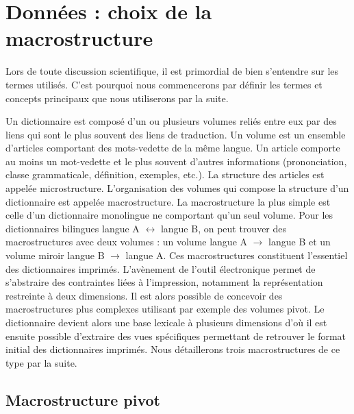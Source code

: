 \documentclass[10pt,a4paper,twoside]{article}
\begin{document}
\section{Données : choix de la macrostructure}
Lors de toute discussion scientifique, il est primordial de bien s'entendre sur les termes utilisés. C'est pourquoi nous commencerons par définir les termes et concepts principaux que nous utiliserons par la suite.

Un dictionnaire est composé d'un ou plusieurs volumes reliés entre eux par des liens qui sont le plus souvent des liens de traduction. Un volume est un ensemble d'articles comportant des mots-vedette de la même langue. Un article comporte au moins un mot-vedette et le plus souvent d'autres informations (prononciation, classe grammaticale, définition, exemples, etc.). La structure des articles est appelée microstructure. L'organisation des volumes qui compose la structure d'un dictionnaire est appelée macrostructure. La macrostructure la plus simple est celle d'un dictionnaire monolingue ne comportant qu'un seul volume. Pour les dictionnaires bilingues langue A \ensuremath{\leftrightarrow} langue B, on peut trouver des macrostructures avec deux volumes : un volume langue A \ensuremath{\to} langue B et un volume miroir langue B \ensuremath{\to} langue A. Ces macrostructures constituent l'essentiel des dictionnaires imprimés. L'avènement de l'outil électronique permet de s'abstraire des contraintes liées à l'impression, notamment la représentation restreinte à deux dimensions. Il est alors possible de concevoir des macrostructures plus complexes utilisant par exemple des volumes pivot. Le dictionnaire devient alors une base lexicale à plusieurs dimensions d'où il est ensuite possible d'extraire des vues spécifiques permettant de retrouver le format initial des dictionnaires imprimés.
Nous détaillerons trois macrostructures de ce type par la suite.

\subsection{Macrostructure pivot}
\end{document}

